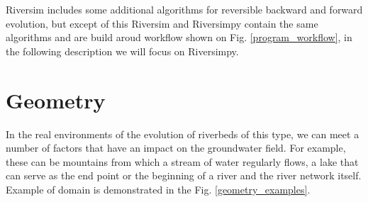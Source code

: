 \documentclass[]{pracamgr}
\begin{document}
    Riversim includes some additional algorithms for reversible backward and forward evolution, but except of this Riversim and Riversimpy contain the same algorithms and are build aroud workflow shown on Fig. \ref{program_workflow}, in the following description we will focus on Riversimpy.

    \section{Geometry}
      
      In the real environments of the evolution of riverbeds of this type, we can meet a number of factors that have an impact on the groundwater field. For example, these can be mountains from which a stream of water regularly flows, a lake that can serve as the end point or the beginning of a river and the river network itself. Example of domain is demonstrated in the Fig. \ref{geometry_examples}.
      
\end{document}
